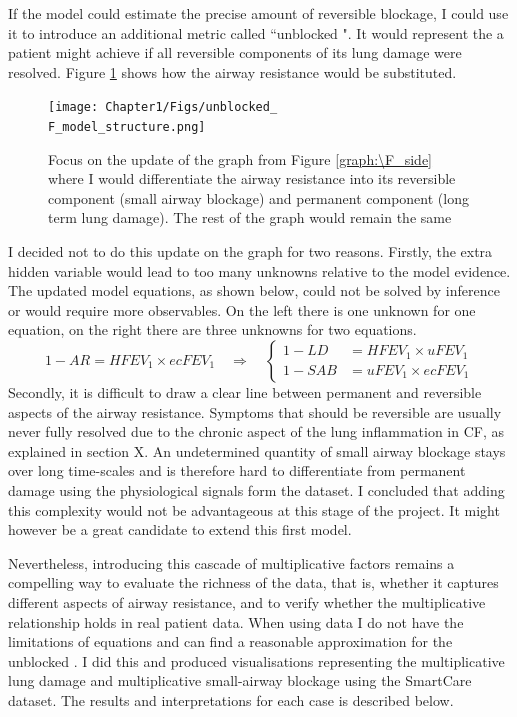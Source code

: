 If the model could estimate the precise amount of reversible blockage, I could use it to introduce an additional metric called “unblocked \F". It would represent the \F a patient might achieve if all reversible components of its lung damage were resolved. Figure \ref{graph:unblocked_\F} shows how the airway resistance would be substituted. 
\begin{figure}[!h]
    \caption{Focus on the update of the graph from Figure \ref{graph:\F_side} where I would differentiate the airway resistance into its reversible component (small airway blockage) and permanent component (long term lung damage). The rest of the graph would remain the same}
    \centering
    \texttt{[image: Chapter1/Figs/unblocked\_\\F\_model\_structure.png]}
    \label{graph:unblocked_\F}
\end{figure}
I decided not to do this update on the graph for two reasons. Firstly, the extra hidden variable would lead to too many unknowns relative to the model evidence. The updated model equations, as shown below, could not be solved by inference or would require more observables. On the left there is one unknown for one equation, on the right there are three unknowns for two equations.
\[
1-AR = H\!F\!EV_1 \times ecF\!EV_1 \quad \Rightarrow \quad 
\left\{
\begin{aligned}
1-LD &= H\!F\!EV_1 \times uF\!EV_1 \\
1-SAB &= uF\!EV_1 \times ecF\!EV_1
\end{aligned}
\right.
\]
Secondly, it is difficult to draw a clear line between permanent and reversible aspects of the airway resistance. Symptoms that should be reversible are usually never fully resolved due to the chronic aspect of the lung inflammation in CF, as explained in section X. An undetermined quantity of small airway blockage stays over long time-scales and is therefore hard to differentiate from permanent damage using the physiological signals form the dataset. I concluded that adding this complexity would not be advantageous at this stage of the project. It might however be a great candidate to extend this first model.

Nevertheless, introducing this cascade of multiplicative factors remains a compelling way to evaluate the richness of the data, that is, whether it captures different aspects of airway resistance, and to verify whether the multiplicative relationship holds in real patient data. When using data I do not have the limitations of equations and can find a reasonable approximation for the unblocked \F. I did this and produced visualisations representing the multiplicative lung damage and multiplicative small-airway blockage using the SmartCare dataset. The results and interpretations for each case is described below.

